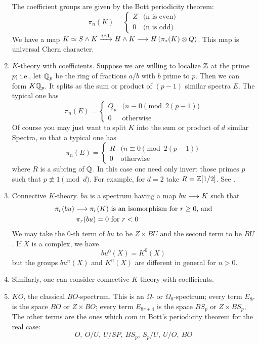 \documentclass[../main]{subfiles}
\begin{document}
\begin{enumerate}
    The coefficient groups are given by the Bott periodicity theorem:
    \[\pi_n(K) =
    \begin{cases}
     Z &\text{(n is even)} \\
     0 &\text{(n is odd)}
    \end{cases}\]
    We have a map $K\simeq S\wedge K\vra{i\wedge 1} H\wedge K \lra H\left( \pi_\ast(K)\otimes Q \right)$. This map is universal Chern character.
    \item $K$-theory with coefficients. Suppose we are willing to localize $\mathbb{Z}$ at the prime $p$; i.e., let $\mathbb{Q}_p$ be the ring of fractions $a/b$ with $b$ prime to $p$. Then we can form $K\mathbb{Q}_p$. It splits as the sum or product of $(p-1)$ similar spectra $E$. The typical one has
    \[\pi_n(E)=
    \begin{cases}
    Q_p &(n\equiv 0 \pmod{2(p-1)} \\
    0 & \text{otherwise}
    \end{cases}\]
    Of course you may just want to split $K$ into the sum or product of $d$ similar Spectra, so that a typical one has
    \[\pi_n(E)=
    \begin{cases}
    R &(n\equiv 0 \pmod{2(p-1)} \\
    0 & \text{otherwise}
    \end{cases}\]
    where $R$ is a subring of $\mathbb{Q}$. In this case one need only invert those primes $p$ such that $p\not\equiv 1 \pmod{d}$. For example, for $d=2$ take $R=\mathbb{Z}[1/2]$. See \plscite{[1]}.
    \item Connective $K$-theory. $bu$ is a spectrum having a map $bu\longrightarrow K$ such that
    \begin{align}
        \pi_r(bu)\longrightarrow\pi_r(K) &\text{ is an isomorphism for }r\geq 0 \text{, and} \nonumber \\
        \pi_r(bu)=0 &\text{ for } r<0 \nonumber
    \end{align}
    We may take the $0$-th term of $bu$ to be $Z\times BU$ and the second term to be $BU$. If $X$ is a complex, we have
    \[bu^0(X)=K^0(X)\]
    but the groups $bu^n(X)$ and $K^n(X)$ are different in general for $n>0$.
    \item Similarly, one can consider connective $K$-theory with coefficients.
    \item $KO$, the classical $BO$-spectrum. This is an $\Omega$- or $\Omega_0$-spectrum; every term $E_{8r}$ is the space $BO$ or $Z\times BO$; every term $E_{8r+4}$ is the space $BS_p$ or $Z\times BS_p$, The other terms are the ones which com in Bott's periodicity theorem for the real case:
    \[O, \:O/U, \:U/SP, \:BS_p, \:S_p/U, \:U/O, \:BO\]
    

\end{enumerate}
\end{document}
